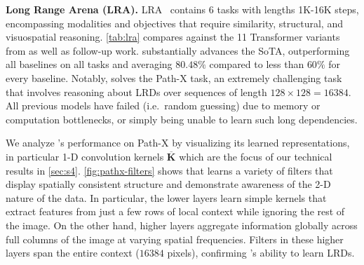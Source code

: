 \textbf{Long Range Arena (LRA).}
LRA~\citep{tay2021long} contains $6$ tasks with lengths 1K-16K steps, encompassing modalities and objectives that require similarity, structural, and visuospatial reasoning.
\cref{tab:lra} compares \methodabbrv{} against the 11 Transformer variants from \citet{tay2021long} as well as follow-up work.
%
\methodabbrv{} substantially advances the SoTA, outperforming all baselines on all tasks and averaging $80.48\%$ compared to less than \( 60\% \) for every baseline.
Notably, \methodabbrv{} solves the Path-X task, an extremely challenging task
that involves reasoning about LRDs over sequences of length \( 128\times 128 = 16384 \).
All previous models have failed (i.e.\ random guessing) due to memory or computation bottlenecks, or simply being unable to learn such long dependencies.

We analyze \methodabbrv's performance on Path-X by visualizing its learned representations,
in particular 1-D convolution kernels \( \bm{\overline{K}} \)
which are the focus of our technical results in \cref{sec:s4}.
\cref{fig:pathx-filters} shows that \methodabbrv{} learns a variety of filters that display spatially consistent structure
and demonstrate awareness of the 2-D nature of the data.
In particular, the lower layers learn simple kernels that extract features from just a few rows of local context while ignoring the rest of the image.
On the other hand, higher layers aggregate information globally across full columns of the image at varying spatial frequencies.
Filters in these higher layers span the entire context ($16384$ pixels), confirming \methodabbrv's ability to learn LRDs.



